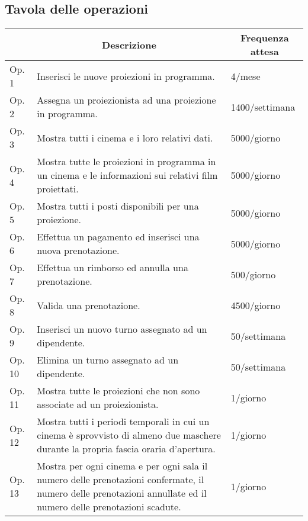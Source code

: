 \subsection*{Tavola delle operazioni}
%
%
\begin{tabularx}{\linewidth}{|l|X|X|}
    \hline
    \rowcolor{tblhdrcolor}
    \multicolumn{1}{|c|}{\textbf{Cod.}}
     & \multicolumn{1}{|c|}{\textbf{Descrizione}}
     & \multicolumn{1}{|c|}{\textbf{Frequenza attesa}}
    \\ \hline
    Op. 1
     & Inserisci le nuove proiezioni in programma.
     & 4/mese
    \\ \hline
    Op. 2
     & Assegna un proiezionista ad una proiezione in programma.
     & 1400/settimana
    \\ \hline
    Op. 3
     & Mostra tutti i cinema e i loro relativi dati.
     & 5000/giorno
    \\ \hline
    Op. 4
     & Mostra tutte le proiezioni in programma in un cinema e le informazioni
    sui relativi film proiettati.
     & 5000/giorno
    \\ \hline
    Op. 5
     & Mostra tutti i posti disponibili per una proiezione.
     & 5000/giorno
    \\ \hline
    Op. 6
     & Effettua un pagamento ed inserisci una nuova prenotazione.
     & 5000/giorno
    \\ \hline
    Op. 7
     & Effettua un rimborso ed annulla una prenotazione.
     & 500/giorno
    \\ \hline
    Op. 8
     & Valida una prenotazione.
     & 4500/giorno
    \\ \hline
    Op. 9
     & Inserisci un nuovo turno assegnato ad un dipendente.
     & 50/settimana
    \\ \hline
    Op. 10
     & Elimina un turno assegnato ad un dipendente.
     & 50/settimana
    \\ \hline
    Op. 11
     & Mostra tutte le proiezioni che non sono associate ad un proiezionista.
     & 1/giorno
    \\ \hline
    Op. 12
     & Mostra tutti i periodi temporali in cui un cinema è sprovvisto di
    almeno due maschere durante la propria fascia oraria d'apertura.
     & 1/giorno
    \\ \hline
    Op. 13
     & Mostra per ogni cinema e per ogni sala il numero delle prenotazioni
    confermate, il numero delle prenotazioni annullate ed il numero delle
    prenotazioni scadute.
     & 1/giorno
    \\ \hline
\end{tabularx}

